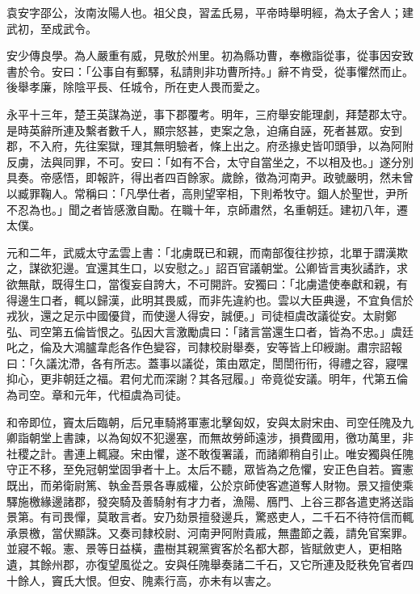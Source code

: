
\begin{pinyinscope}
袁安字邵公，汝南汝陽人也。祖父良，習孟氏易，平帝時舉明經，為太子舍人；建武初，至成武令。

安少傳良學。為人嚴重有威，見敬於州里。初為縣功曹，奉檄詣從事，從事因安致書於令。安曰：「公事自有郵驛，私請則非功曹所持。」辭不肯受，從事懼然而止。後舉孝廉，除陰平長、任城令，所在吏人畏而愛之。

永平十三年，楚王英謀為逆，事下郡覆考。明年，三府舉安能理劇，拜楚郡太守。是時英辭所連及繫者數千人，顯宗怒甚，吏案之急，迫痛自誣，死者甚眾。安到郡，不入府，先往案獄，理其無明驗者，條上出之。府丞掾史皆叩頭爭，以為阿附反虜，法與同罪，不可。安曰：「如有不合，太守自當坐之，不以相及也。」遂分別具奏。帝感悟，即報許，得出者四百餘家。歲餘，徵為河南尹。政號嚴明，然未曾以臧罪鞠人。常稱曰：「凡學仕者，高則望宰相，下則希牧守。錮人於聖世，尹所不忍為也。」聞之者皆感激自勵。在職十年，京師肅然，名重朝廷。建初八年，遷太僕。

元和二年，武威太守孟雲上書：「北虜既已和親，而南部復往抄掠，北單于謂漢欺之，謀欲犯邊。宜還其生口，以安慰之。」詔百官議朝堂。公卿皆言夷狄譎詐，求欲無猒，既得生口，當復妄自誇大，不可開許。安獨曰：「北虜遣使奉獻和親，有得邊生口者，輒以歸漢，此明其畏威，而非先違約也。雲以大臣典邊，不宜負信於戎狄，還之足示中國優貸，而使邊人得安，誠便。」司徒桓虞改議從安。太尉鄭弘、司空第五倫皆恨之。弘因大言激勵虞曰：「諸言當還生口者，皆為不忠。」虞廷叱之，倫及大鴻臚韋彪各作色變容，司隸校尉舉奏，安等皆上印綬謝。肅宗詔報曰：「久議沈滯，各有所志。蓋事以議從，策由眾定，誾誾衎衎，得禮之容，寢嘿抑心，更非朝廷之福。君何尤而深謝？其各冠履。」帝竟從安議。明年，代第五倫為司空。章和元年，代桓虞為司徒。

和帝即位，竇太后臨朝，后兄車騎將軍憲北擊匈奴，安與太尉宋由、司空任隗及九卿詣朝堂上書諫，以為匈奴不犯邊塞，而無故勞師遠涉，損費國用，徼功萬里，非社稷之計。書連上輒寢。宋由懼，遂不敢復署議，而諸卿稍自引止。唯安獨與任隗守正不移，至免冠朝堂固爭者十上。太后不聽，眾皆為之危懼，安正色自若。竇憲既出，而弟衛尉篤、執金吾景各專威權，公於京師使客遮道奪人財物。景又擅使乘驛施檄緣邊諸郡，發突騎及善騎射有才力者，漁陽、鴈門、上谷三郡各遣吏將送詣景第。有司畏憚，莫敢言者。安乃劾景擅發邊兵，驚惑吏人，二千石不待符信而輒承景檄，當伏顯誅。又奏司隸校尉、河南尹阿附貴戚，無盡節之義，請免官案罪。並寢不報。憲、景等日益橫，盡樹其親黨賓客於名都大郡，皆賦斂吏人，更相賂遺，其餘州郡，亦復望風從之。安與任隗舉奏諸二千石，又它所連及貶秩免官者四十餘人，竇氏大恨。但安、隗素行高，亦未有以害之。


\end{pinyinscope}
